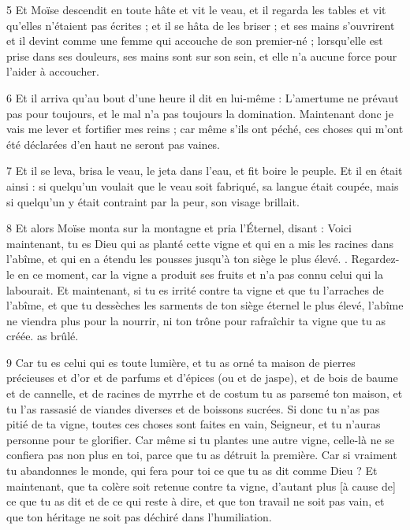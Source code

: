 \par 5 Et Moïse descendit en toute hâte et vit le veau, et il regarda les tables et vit qu'elles n'étaient pas écrites ; et il se hâta de les briser ; et ses mains s'ouvrirent et il devint comme une femme qui accouche de son premier-né ; lorsqu'elle est prise dans ses douleurs, ses mains sont sur son sein, et elle n'a aucune force pour l'aider à accoucher.

\par 6 Et il arriva qu'au bout d'une heure il dit en lui-même : L'amertume ne prévaut pas pour toujours, et le mal n'a pas toujours la domination. Maintenant donc je vais me lever et fortifier mes reins ; car même s'ils ont péché, ces choses qui m'ont été déclarées d'en haut ne seront pas vaines.

\par 7 Et il se leva, brisa le veau, le jeta dans l'eau, et fit boire le peuple. Et il en était ainsi : si quelqu'un voulait que le veau soit fabriqué, sa langue était coupée, mais si quelqu'un y était contraint par la peur, son visage brillait.

\par 8 Et alors Moïse monta sur la montagne et pria l'Éternel, disant : Voici maintenant, tu es Dieu qui as planté cette vigne et qui en a mis les racines dans l'abîme, et qui en a étendu les pousses jusqu'à ton siège le plus élevé. . Regardez-le en ce moment, car la vigne a produit ses fruits et n'a pas connu celui qui la labourait. Et maintenant, si tu es irrité contre ta vigne et que tu l'arraches de l'abîme, et que tu dessèches les sarments de ton siège éternel le plus élevé, l'abîme ne viendra plus pour la nourrir, ni ton trône pour rafraîchir ta vigne que tu as créée. as brûlé.

\par 9 Car tu es celui qui es toute lumière, et tu as orné ta maison de pierres précieuses et d'or et de parfums et d'épices (ou et de jaspe), et de bois de baume et de cannelle, et de racines de myrrhe et de costum tu as parsemé ton maison, et tu l'as rassasié de viandes diverses et de boissons sucrées. Si donc tu n'as pas pitié de ta vigne, toutes ces choses sont faites en vain, Seigneur, et tu n'auras personne pour te glorifier. Car même si tu plantes une autre vigne, celle-là ne se confiera pas non plus en toi, parce que tu as détruit la première. Car si vraiment tu abandonnes le monde, qui fera pour toi ce que tu as dit comme Dieu ? Et maintenant, que ta colère soit retenue contre ta vigne, d'autant plus [à cause de] ce que tu as dit et de ce qui reste à dire, et que ton travail ne soit pas vain, et que ton héritage ne soit pas déchiré dans l'humiliation.

